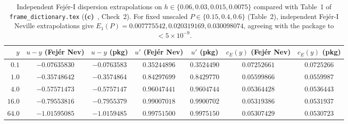 \documentclass[11pt,a4paper]{article}
\newcommand{\Lc}{\textsf{\textbf{(c)}}\ }
\begin{document}
\begin{table}[ht]\centering\small
\setlength{\tabcolsep}{4.5pt}
\begin{tabular}{@{}rcccccc@{}}\toprule
$y$ & $u-y$ (Fej\'er Nev) & $u-y$ (pkg) & $u'$ (Fej\'er Nev) & $u'$ (pkg)
 & $c_E(y)$ (Fej\'er Nev) & $c_E(y)$ (pkg)\\\midrule
$0.1$  & $-0.07635830$ & $-0.0763583$ & $0.35244896$ & $0.3524490$ & $0.07252661$ & $0.0725266$\\
$1.0$  & $-0.35748642$ & $-0.3574864$ & $0.84297699$ & $0.8429770$ & $0.05599866$ & $0.0559987$\\
$4.0$  & $-0.57571473$ & $-0.5757147$ & $0.96047441$ & $0.9604744$ & $0.05364428$ & $0.0536443$\\
$16.0$ & $-0.79553816$ & $-0.7955379$ & $0.99007018$ & $0.9900702$ & $0.05319386$ & $0.0531937$\\
$64.0$ & $-1.01595085$ & $-1.0159485$ & $0.99751500$ & $0.9975150$ & $0.05307429$ & $0.0530723$\\\bottomrule
\end{tabular}
\caption{Independent Fej\'er-I dispersion extrapolations on $h\in\{0.06,0.03,0.015,0.0075\}$
compared with Table~1 of \texttt{frame\_\allowbreak dictionary.tex} (\Lc, Check~2).
For fixed unscaled $P\in\{0.15,0.4,0.6\}$ (Table~2), independent Fej\'er-I Neville
extrapolations give $E_1(P)=0.007775542, 0.020319169, 0.030098074$, agreeing with the
package to $<5\times 10^{-9}$.}\label{tab:disp_audit}
\end{table}
\end{document}
